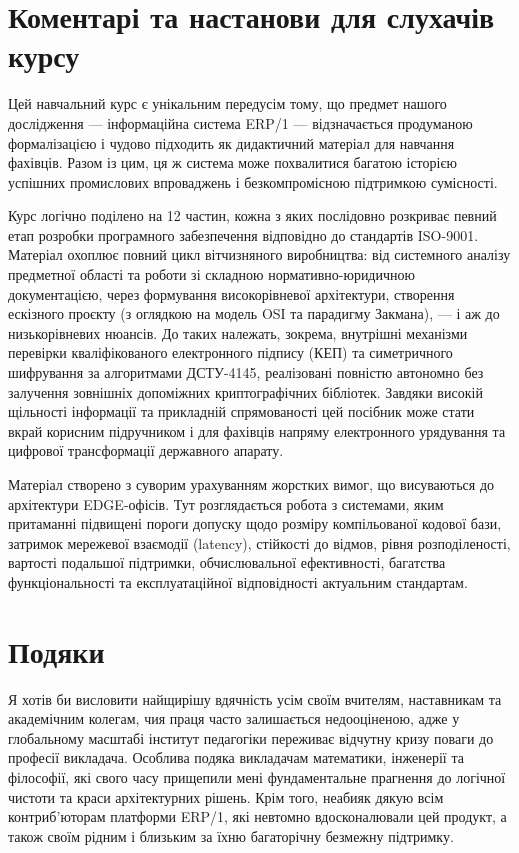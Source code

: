 \section*{Коментарі та настанови для слухачів курсу}

Цей навчальний курс є унікальним передусім тому, що предмет нашого дослідження — інформаційна система ERP/1 — відзначається продуманою формалізацією і чудово підходить як дидактичний матеріал для навчання фахівців. Разом із цим, ця ж система може похвалитися багатою історією успішних промислових впроваджень і безкомпромісною підтримкою сумісності.

Курс логічно поділено на 12 частин, кожна з яких послідовно розкриває певний етап розробки програмного забезпечення відповідно до стандартів ISO-9001. Матеріал охоплює повний цикл вітчизняного виробництва: від системного аналізу предметної області та роботи зі складною нормативно-юридичною документацією, через формування високорівневої архітектури, створення ескізного проєкту (з оглядкою на модель OSI та парадигму Закмана), — і аж до низькорівневих нюансів. До таких належать, зокрема, внутрішні механізми перевірки кваліфікованого електронного підпису (КЕП) та симетричного шифрування за алгоритмами ДСТУ-4145, реалізовані повністю автономно без залучення зовнішніх допоміжних криптографічних бібліотек. Завдяки високій щільності інформації та прикладній спрямованості цей посібник може стати вкрай корисним підручником і для фахівців напряму електронного урядування та цифрової трансформації державного апарату.

Матеріал створено з суворим урахуванням жорстких вимог, що висуваються до архітектури EDGE-офісів. Тут розглядається робота з системами, яким притаманні підвищені пороги допуску щодо розміру компільованої кодової бази, затримок мережевої взаємодії (latency), стійкості до відмов, рівня розподіленості, вартості подальшої підтримки, обчислювальної ефективності, багатства функціональності та експлуатаційної відповідності актуальним стандартам.

\section*{Подяки}

Я хотів би висловити найщирішу вдячність усім своїм вчителям, наставникам та академічним колегам, чия праця часто залишається недооціненою,
адже у глобальному масштабі інститут педагогіки переживає відчутну кризу поваги до професії викладача.
Особлива подяка викладачам математики, інженерії та філософії, які свого часу прищепили мені фундаментальне прагнення до логічної
чистоти та краси архітектурних рішень. Крім того, неабияк дякую всім контриб'юторам платформи ERP/1,
які невтомно вдосконалювали цей продукт, а також своїм рідним і близьким за їхню багаторічну безмежну підтримку.


